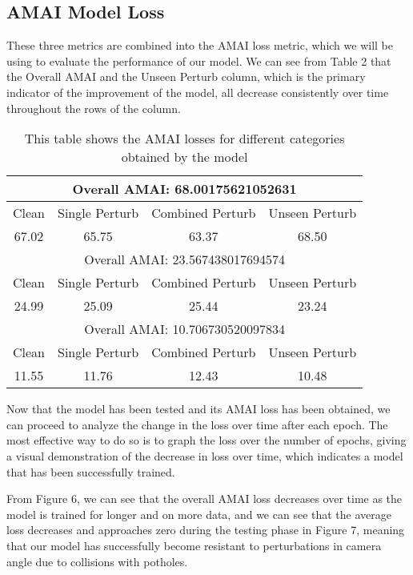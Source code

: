 \documentclass{article}
\begin{document}
\subsection{AMAI Model Loss}

These three metrics are combined into the AMAI loss metric, which we will be using to evaluate the performance of our model. We can see from Table 2 that the Overall AMAI and the Unseen Perturb column, which is the primary indicator of the improvement of the model, all decrease consistently over time throughout the rows of the column. 

\begin{table}[h!]
\centering
\begin{tabular}{||c c c c||} 
 \hline
 \multicolumn{4}{|c|}{Overall AMAI: 68.00175621052631} \\ [0.5ex]
 \hline\hline
  Clean & Single Perturb & Combined Perturb & Unseen Perturb \\ [0.5ex] 
  \hline\hline
 67.02 & 65.75 & 63.37 & 68.50 \\ 
 \hline
 
 \hline
 \multicolumn{4}{|c|}{Overall AMAI: 23.567438017694574} \\ [0.5ex]
 \hline\hline
  Clean & Single Perturb & Combined Perturb & Unseen Perturb \\ [0.5ex] 
  \hline\hline
 24.99 & 25.09 & 25.44 & 23.24 \\ 
 \hline

  \hline
 \multicolumn{4}{|c|}{Overall AMAI: 10.706730520097834} \\ [0.5ex]
 \hline\hline
  Clean & Single Perturb & Combined Perturb & Unseen Perturb \\ [0.5ex] 
  \hline\hline
 11.55 & 11.76 & 12.43 & 10.48 \\ 
 \hline
\end{tabular}
\label{table:AMAIlosses}
\caption{This table shows the AMAI losses for different categories obtained by the model}
\end{table}

Now that the model has been tested and its AMAI loss has been obtained, we can proceed to analyze the change in the loss over time after each epoch. The most effective way to do so is to graph the loss over the number of epochs, giving a visual demonstration of the decrease in loss over time, which indicates a model that has been successfully trained.

From Figure 6, we can see that the overall AMAI loss decreases over time as the model is trained for longer and on more data, and we can see that the average loss decreases and approaches zero during the testing phase in Figure 7, meaning that our model has successfully become resistant to perturbations in camera angle due to collisions with potholes.
\end{document}
